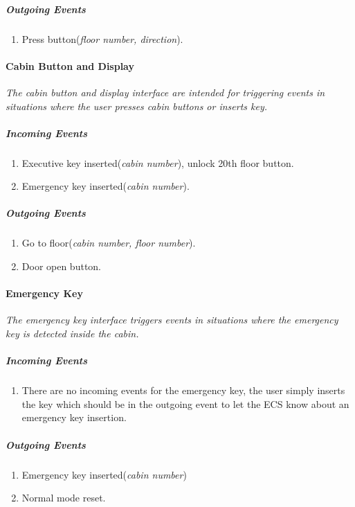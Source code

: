\documentclass[12pt]{article}
\begin{document}
				\subparagraph{Outgoing Events}
					\begin{enumerate}
						\item Press button(\textit{floor number, direction}).
					\end{enumerate}
				
		
			\paragraph{Cabin Button and Display}		
			\textit{The cabin button and display interface are intended for triggering 
			events in situations where the user presses cabin buttons or inserts key. }
				\subparagraph{Incoming Events}
					\begin{enumerate}
						\item Executive key inserted(\textit{cabin number}), unlock 20th floor button.
						\item Emergency key inserted(\textit{cabin number}).
					\end{enumerate}
				
				\subparagraph{Outgoing Events}
					\begin{enumerate}
						\item Go to floor(\textit{cabin number, floor number}).
						\item Door open button.
					\end{enumerate}
		
			\paragraph{Emergency Key}
			\textit{The emergency key interface triggers events in situations where 
			the emergency key is detected inside the cabin.}
				\subparagraph{Incoming Events}
					\begin{enumerate}
						\item There are no incoming events for the emergency key, the user simply inserts 
						the key which should be in the outgoing event to let the ECS know about an emergency 
						key insertion.
					\end{enumerate}
				
				\subparagraph{Outgoing Events}
					\begin{enumerate}
						\item Emergency key inserted(\textit{cabin number})
						\item Normal mode reset.
					\end{enumerate}
				
\end{document}
